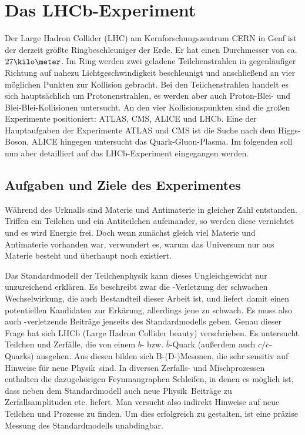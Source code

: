 \chapter{Das LHCb-Experiment}
Der Large Hadron Collider (LHC) am Kernforschungszentrum CERN in Genf ist der derzeit größte Ringbeschleuniger der Erde. Er hat einen Durchmesser von ca. $27\kilo\meter$. Im Ring werden zwei geladene Teilchenstrahlen in gegenläufiger Richtung auf nahezu Lichtgeschwindigkeit beschleunigt und anschließend an vier möglichen Punkten zur Kollision gebracht. Bei den Teilchenstrahlen handelt es sich hauptsächlich um Protonenstrahlen, es werden aber auch Proton-Blei- und Blei-Blei-Kollisionen untersucht. An den vier Kollisionspunkten sind die großen Experimente positioniert: ATLAS, CMS, ALICE und LHCb. Eine der Hauptaufgaben der Experimente ATLAS und CMS ist die Suche nach dem Higgs-Boson, ALICE hingegen untersucht das Quark-Gluon-Plasma. Im folgenden soll nun aber detailliert auf das LHCb-Experiment eingegangen werden. \cite{lhc-info}
\section{Aufgaben und Ziele des Experimentes}
Während des Urknalls sind Materie und Antimaterie in gleicher Zahl entstanden. Triffen ein Teilchen und ein Antiteilchen aufeinander, so werden diese vernichtet und es wird Energie frei. Doch wenn zunächst gleich viel Materie und Antimaterie vorhanden war, verwundert es, warum das Universum nur aus Materie besteht und überhaupt noch existiert.

Das Standardmodell der Teilchenphysik kann dieses Ungleichgewicht nur unzureichend erklären. Es beschreibt zwar die \CP-Verletzung der schwachen Wechselwirkung, die auch Bestandteil dieser Arbeit ist, und liefert damit einen potentiellen Kandidaten zur Erkärung, allerdings jene zu schwach. Es muss also auch \CP-verletzende Beiträge jenseits des Standardmodells geben. Genau dieser Frage hat sich LHCb (Large Hadron Collider beauty) verschrieben. Es untersucht Teilchen und Zerfälle, die von einem $b$- bzw. $\overline{b}$-Quark (außerdem auch $c/\overline{c}$-Quarks) ausgehen. Aus diesen bilden sich B-(D-)Mesonen, die sehr sensitiv auf Hinweise für \glqq neue Physik\grqq\ sind. In diversen Zerfalls- und Mischprozessen enthalten die dazugehörigen Feynmangraphen Schleifen, in denen es möglich ist, dass neben dem Standardmodell auch \glqq neue Physik\grqq\ Beiträge zu Zerfallsamplituden etc. liefert. Man versucht also indirekt Hinweise auf neue Teilchen und Prozesse zu finden. Um dies erfolgreich zu gestalten, ist eine präzise Messung des Standardmodells unabdingbar. \cite{lhcb-info}

